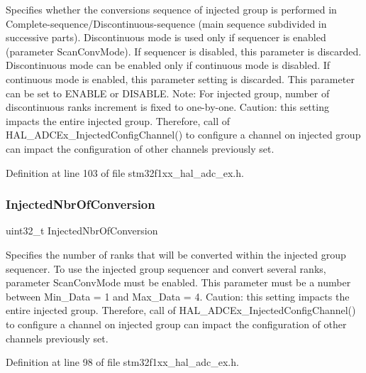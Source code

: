 Specifies whether the conversions sequence of injected group is performed in Complete-\/sequence/\+Discontinuous-\/sequence (main sequence subdivided in successive parts). Discontinuous mode is used only if sequencer is enabled (parameter \textquotesingle{}Scan\+Conv\+Mode\textquotesingle{}). If sequencer is disabled, this parameter is discarded. Discontinuous mode can be enabled only if continuous mode is disabled. If continuous mode is enabled, this parameter setting is discarded. This parameter can be set to E\+N\+A\+B\+LE or D\+I\+S\+A\+B\+LE. Note\+: For injected group, number of discontinuous ranks increment is fixed to one-\/by-\/one. Caution\+: this setting impacts the entire injected group. Therefore, call of H\+A\+L\+\_\+\+A\+D\+C\+Ex\+\_\+\+Injected\+Config\+Channel() to configure a channel on injected group can impact the configuration of other channels previously set. 

Definition at line 103 of file stm32f1xx\+\_\+hal\+\_\+adc\+\_\+ex.\+h.

\mbox{\label{struct_a_d_c___injection_conf_type_def_a6988026b36336bb3099410ce45688585}} 
\subsubsection{\texorpdfstring{Injected\+Nbr\+Of\+Conversion}{InjectedNbrOfConversion}}
{\footnotesize\ttfamily uint32\+\_\+t Injected\+Nbr\+Of\+Conversion}

Specifies the number of ranks that will be converted within the injected group sequencer. To use the injected group sequencer and convert several ranks, parameter \textquotesingle{}Scan\+Conv\+Mode\textquotesingle{} must be enabled. This parameter must be a number between Min\+\_\+\+Data = 1 and Max\+\_\+\+Data = 4. Caution\+: this setting impacts the entire injected group. Therefore, call of H\+A\+L\+\_\+\+A\+D\+C\+Ex\+\_\+\+Injected\+Config\+Channel() to configure a channel on injected group can impact the configuration of other channels previously set. 

Definition at line 98 of file stm32f1xx\+\_\+hal\+\_\+adc\+\_\+ex.\+h.


